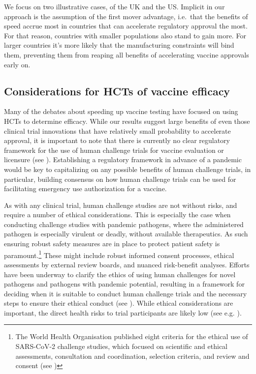 \documentclass{article}
\begin{document}
We focus on two illustrative cases, of the UK and the US. Implicit in our approach is the assumption of the first mover advantage, i.e.~that the benefits of speed accrue most in countries that can accelerate regulatory approval the most. For that reason, countries with smaller populations also stand to gain more. For larger countries it's more likely that the manufacturing constraints will bind them, preventing them from reaping all benefits of accelerating vaccine approvals early on.

\subsection{Considerations for HCTs of vaccine efficacy}\label{considerations-for-hcts-of-vaccine-efficacy}

Many of the debates about speeding up vaccine testing have focused on using HCTs to determine efficacy. While our results suggest large benefits of even those clinical trial innovations that have relatively small probability to accelerate approval, it is important to note that there is currently no clear regulatory framework for the use of human challenge trials for vaccine evaluation or licensure (see \citet{Baylor2021Human}). Establishing a regulatory framework in advance of a pandemic would be key to capitalizing on any possible benefits of human challenge trials, in particular, building consensus on how human challenge trials can be used for facilitating emergency use authorization for a vaccine.

As with any clinical trial, human challenge studies are not without risks, and require a number of ethical considerations. This is especially the case when conducting challenge studies with pandemic pathogens, where the administered pathogen is especially virulent or deadly, without available therapeutics. As such ensuring robust safety measures are in place to protect patient safety is paramount.\footnote{The World Health Organisation published eight criteria for the ethical use of SARS-CoV-2 challenge studies, which focused on scientific and ethical assessments, consultation and coordination, selection criteria, and review and consent (see \citet{Jamrozik2021Key})} These might include robust informed consent processes, ethical assessments by external review boards, and nuanced risk-benefit analyses. Efforts have been underway to clarify the ethics of using human challenges for novel pathogens and pathogens with pandemic potential, resulting in a framework for deciding when it is suitable to conduct human challenge trials and the necessary steps to ensure their ethical conduct (see \citet{Williams2023Ethics}). While ethical considerations are important, the direct health risks to trial participants are likely low (see e.g. \citet{Manheim2021Exploring}).
\end{document}
